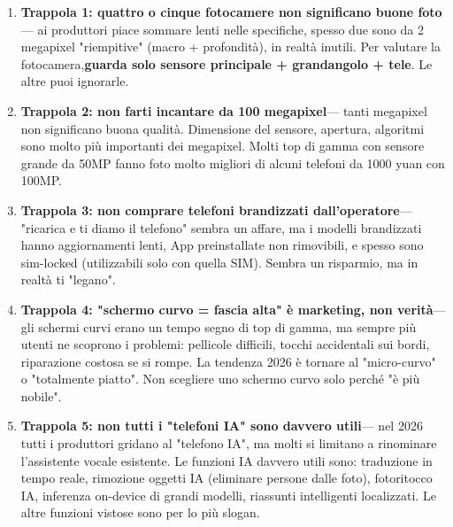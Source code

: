 \begin{enumerate}
  \item \textbf{Trappola 1: quattro o cinque fotocamere non significano buone foto}— ai produttori piace sommare lenti nelle specifiche, spesso due sono da 2 megapixel "riempitive" (macro + profondità), in realtà inutili. Per valutare la fotocamera,\textbf{guarda solo sensore principale + grandangolo + tele}. Le altre puoi ignorarle.
  \item \textbf{Trappola 2: non farti incantare da 100 megapixel}— tanti megapixel non significano buona qualità. Dimensione del sensore, apertura, algoritmi sono molto più importanti dei megapixel. Molti top di gamma con sensore grande da 50MP fanno foto molto migliori di alcuni telefoni da 1000 yuan con 100MP.
  \item \textbf{Trappola 3: non comprare telefoni brandizzati dall'operatore}— "ricarica e ti diamo il telefono" sembra un affare, ma i modelli brandizzati hanno aggiornamenti lenti, App preinstallate non rimovibili, e spesso sono sim-locked (utilizzabili solo con quella SIM). Sembra un risparmio, ma in realtà ti "legano".
  \item \textbf{Trappola 4: "schermo curvo = fascia alta" è marketing, non verità}— gli schermi curvi erano un tempo segno di top di gamma, ma sempre più utenti ne scoprono i problemi: pellicole difficili, tocchi accidentali sui bordi, riparazione costosa se si rompe. La tendenza 2026 è tornare al "micro-curvo" o "totalmente piatto". Non scegliere uno schermo curvo solo perché "è più nobile".
  \item \textbf{Trappola 5: non tutti i "telefoni IA" sono davvero utili}— nel 2026 tutti i produttori gridano al "telefono IA", ma molti si limitano a rinominare l'assistente vocale esistente. Le funzioni IA davvero utili sono: traduzione in tempo reale, rimozione oggetti IA (eliminare persone dalle foto), fotoritocco IA, inferenza on-device di grandi modelli, riassunti intelligenti localizzati. Le altre funzioni vistose sono per lo più slogan.
\end{enumerate}


